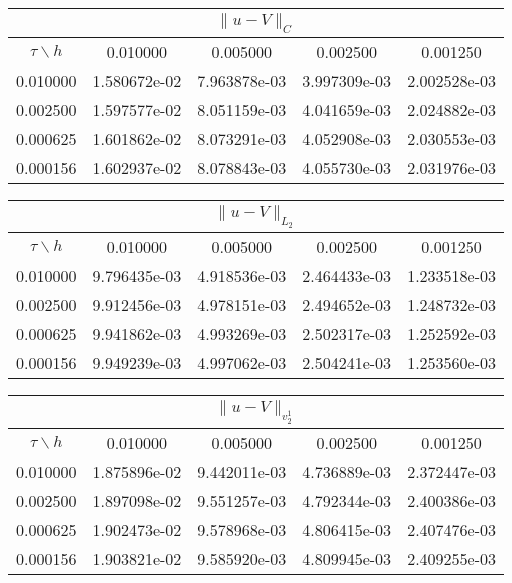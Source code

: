 \documentclass[a4paper,12pt]{article}
\begin{document}
\begin{center}
\begin{tabular}{|c|c|c|c|c|}
\hline
\multicolumn{5}{|c|}{$\|u - V \| _{C}$}\\ 
\hline
$\tau \backslash h$ & 0.010000 & 0.005000 & 0.002500 & 0.001250 \\ 
\hline
0.010000 & 1.580672e-02 & 7.963878e-03 & 3.997309e-03 & 2.002528e-03 \\ 
\hline
0.002500 & 1.597577e-02 & 8.051159e-03 & 4.041659e-03 & 2.024882e-03 \\ 
\hline
0.000625 & 1.601862e-02 & 8.073291e-03 & 4.052908e-03 & 2.030553e-03 \\ 
\hline
0.000156 & 1.602937e-02 & 8.078843e-03 & 4.055730e-03 & 2.031976e-03 \\ 
\hline
\end{tabular}
\end{center}
\begin{center}
\begin{tabular}{|c|c|c|c|c|}
\hline
\multicolumn{5}{|c|}{$\|u - V \| _{L_2}$}\\ 
\hline
$\tau \backslash h$ & 0.010000 & 0.005000 & 0.002500 & 0.001250 \\ 
\hline
0.010000 & 9.796435e-03 & 4.918536e-03 & 2.464433e-03 & 1.233518e-03 \\ 
\hline
0.002500 & 9.912456e-03 & 4.978151e-03 & 2.494652e-03 & 1.248732e-03 \\ 
\hline
0.000625 & 9.941862e-03 & 4.993269e-03 & 2.502317e-03 & 1.252592e-03 \\ 
\hline
0.000156 & 9.949239e-03 & 4.997062e-03 & 2.504241e-03 & 1.253560e-03 \\ 
\hline
\end{tabular}
\end{center}
\begin{center}
\begin{tabular}{|c|c|c|c|c|}
\hline
\multicolumn{5}{|c|}{$\|u - V \| _{v_2^1}$}\\ 
\hline
$\tau \backslash h$ & 0.010000 & 0.005000 & 0.002500 & 0.001250 \\ 
\hline
0.010000 & 1.875896e-02 & 9.442011e-03 & 4.736889e-03 & 2.372447e-03 \\ 
\hline
0.002500 & 1.897098e-02 & 9.551257e-03 & 4.792344e-03 & 2.400386e-03 \\ 
\hline
0.000625 & 1.902473e-02 & 9.578968e-03 & 4.806415e-03 & 2.407476e-03 \\ 
\hline
0.000156 & 1.903821e-02 & 9.585920e-03 & 4.809945e-03 & 2.409255e-03 \\ 
\hline
\end{tabular}
\end{center}
\end{document}
